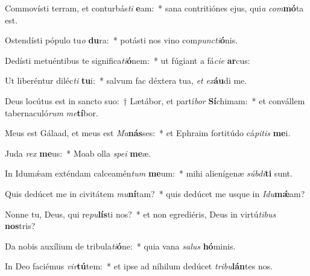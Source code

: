 \item Commovísti terram, et conturbás\textit{ti} \textbf{e}am:~* sana contritiónes ejus, qui\textit{a} \textit{com}\textbf{mó}ta est.
\item Ostendísti pópulo tu\textit{o} \textbf{du}ra:~* potásti nos vino com\textit{punc}\textit{ti}\textbf{ó}nis.
\item Dedísti metuéntibus te significa\textit{ti}\textbf{ó}nem:~* ut fúgiant a fá\textit{ci}\textit{e} \textbf{ar}cus:
\item Ut liberéntur diléc\textit{ti} \textbf{tu}i:~* salvum fac déxtera tua, \textit{et} \textit{ex}\textbf{áu}di me.
\item Deus locútus est in sancto suo:~† Lætábor, et partí\textit{bor} \textbf{Sí}chimam:~* et convállem tabernaculó\textit{rum} \textit{me}\textbf{tí}bor.
\item Meus est Gálaad, et meus est \textit{Ma}\textbf{nás}ses:~* et Ephraim fortitúdo cá\textit{pi}\textit{tis} \textbf{me}i.
\item Juda \textit{rex} \textbf{me}us:~* Moab olla \textit{spe}\textit{i} \textbf{me}æ.
\item In Idumǽam exténdam calceamén\textit{tum} \textbf{me}um:~* mihi alienígenæ \textit{súb}\textit{di}\textbf{ti} sunt.
\item Quis dedúcet me in civitátem \textit{mu}\textbf{ní}tam?~* quis dedúcet me usque in \textit{I}\textit{du}\textbf{mǽ}am?
\item Nonne tu, Deus, qui re\textit{pu}\textbf{lís}ti nos?~* et non egrediéris, Deus in virtú\textit{ti}\textit{bus} \textbf{nos}tris?
\item Da nobis auxílium de tribula\textit{ti}\textbf{ó}ne:~* quia vana \textit{sa}\textit{lus} \textbf{hó}minis.
\item In Deo faciémus \textit{vir}\textbf{tú}tem:~* et ipse ad níhilum dedúcet \textit{tri}\textit{bu}\textbf{lán}tes nos.
